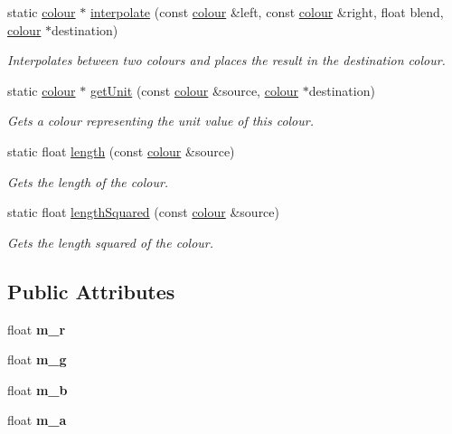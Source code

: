 \begin{DoxyCompactItemize}
static \hyperlink{classflounder_1_1colour}{colour} $\ast$ \hyperlink{classflounder_1_1colour_a28e6e41406cd96df4d956a2c963fd767}{interpolate} (const \hyperlink{classflounder_1_1colour}{colour} \&left, const \hyperlink{classflounder_1_1colour}{colour} \&right, float blend, \hyperlink{classflounder_1_1colour}{colour} $\ast$destination)
\begin{DoxyCompactList}\small\item\em Interpolates between two colours and places the result in the destination colour. \end{DoxyCompactList}\item 
static \hyperlink{classflounder_1_1colour}{colour} $\ast$ \hyperlink{classflounder_1_1colour_a3f9e4ec638e7e240d86704d821d0c3bc}{get\+Unit} (const \hyperlink{classflounder_1_1colour}{colour} \&source, \hyperlink{classflounder_1_1colour}{colour} $\ast$destination)
\begin{DoxyCompactList}\small\item\em Gets a colour representing the unit value of this colour. \end{DoxyCompactList}\item 
static float \hyperlink{classflounder_1_1colour_adb8aba4ecd184a4fbdf04261db788096}{length} (const \hyperlink{classflounder_1_1colour}{colour} \&source)
\begin{DoxyCompactList}\small\item\em Gets the length of the colour. \end{DoxyCompactList}\item 
static float \hyperlink{classflounder_1_1colour_a9eae1aa8bda5bec5c914edfc4f077057}{length\+Squared} (const \hyperlink{classflounder_1_1colour}{colour} \&source)
\begin{DoxyCompactList}\small\item\em Gets the length squared of the colour. \end{DoxyCompactList}\end{DoxyCompactItemize}
\subsection*{Public Attributes}
\begin{DoxyCompactItemize}
\item 
\mbox{\label{classflounder_1_1colour_a0ae0fe6bddb3910fea81d6a07f60b66a}} 
float {\bfseries m\+\_\+r}
\item 
\mbox{\label{classflounder_1_1colour_acec0d6d243305d4bda1c5c2f5178f653}} 
float {\bfseries m\+\_\+g}
\item 
\mbox{\label{classflounder_1_1colour_a3939a175ec1625ae1a5cd4be2eb9d20f}} 
float {\bfseries m\+\_\+b}
\item 
\mbox{\label{classflounder_1_1colour_a3203ca77742b725400763ae4bd4380e4}} 
float {\bfseries m\+\_\+a}
\end{DoxyCompactItemize}


